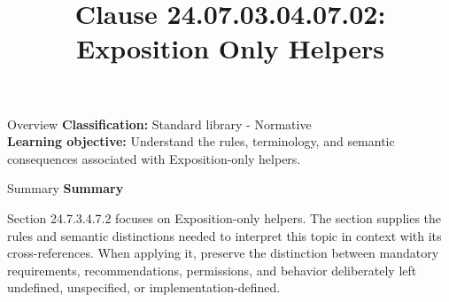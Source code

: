\documentclass[10pt,letterpaper]{article}
\title{Clause 24.07.03.04.07.02: Exposition Only Helpers}
\author{}
\date{}
\begin{document}
\maketitle
\begin{CornellOverviewBox}{Overview}
\textbf{Classification:} Standard library - Normative\\[2pt]
\textbf{Learning objective:} Understand the rules, terminology, and semantic consequences associated with Exposition-only helpers.
\end{CornellOverviewBox}\begin{CornellSummaryBox}{Summary}
{\sffamily\bfseries\color{Accent} Summary}\par\vspace{3pt}Section 24.7.3.4.7.2 focuses on Exposition-only helpers. The section supplies the rules and semantic distinctions needed to interpret this topic in context with its cross-references. When applying it, preserve the distinction between mandatory requirements, recommendations, permissions, and behavior deliberately left undefined, unspecified, or implementation-defined.
\end{CornellSummaryBox}
\end{document}
